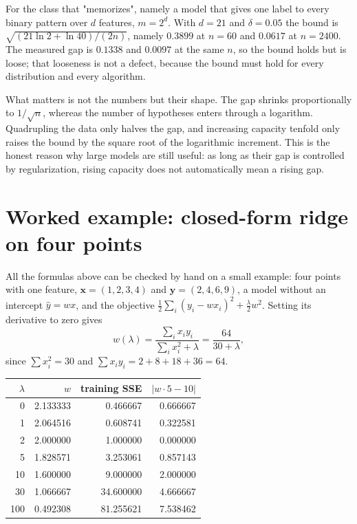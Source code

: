 For the class that "memorizes", namely a model that gives one label to every binary
pattern over $d$ features, $m=2^d$. With $d=21$ and $\delta=0.05$ the bound is
$\sqrt{(21\ln2+\ln40)/(2n)}$, namely $0.3899$ at $n=60$ and $0.0617$ at
$n=2400$. The measured gap is $0.1338$ and $0.0097$ at the same $n$, so the bound
holds but is loose; that looseness is not a defect, because the bound must hold for
every distribution and every algorithm.

What matters is not the numbers but their shape. The gap shrinks proportionally to
$1/\sqrt n$, whereas the number of hypotheses enters through a logarithm. Quadrupling
the data only halves the gap, and increasing capacity tenfold only raises the bound by
the square root of the logarithmic increment. This is the honest reason why large
models are still useful: as long as their gap is controlled by regularization, rising
capacity does not automatically mean a rising gap.
\section{Worked example: closed-form ridge on four points}

All the formulas above can be checked by hand on a small example: four points with
one feature, $\mathbf{x}=(1,2,3,4)$ and $\mathbf{y}=(2,4,6,9)$, a model without an
intercept $\hat y=wx$, and the objective $\frac12\sum_i(y_i-wx_i)^2+\frac{\lambda}{2}w^2$.
Setting its derivative to zero gives
\[
w(\lambda)=\frac{\sum_ix_iy_i}{\sum_ix_i^2+\lambda}=\frac{64}{30+\lambda},
\]
since $\sum x_i^2=30$ and $\sum x_iy_i=2+8+18+36=64$.

\begin{center}
\small
\begin{tabular}{rrrr}
\hline
$\lambda$ & $w$ & training SSE & $|w\cdot5-10|$ \\
\hline
0   & 2.133333 & 0.466667 & 0.666667 \\
1   & 2.064516 & 0.608741 & 0.322581 \\
2   & 2.000000 & 1.000000 & 0.000000 \\
5   & 1.828571 & 3.253061 & 0.857143 \\
10  & 1.600000 & 9.000000 & 2.000000 \\
30  & 1.066667 & 34.600000 & 4.666667 \\
100 & 0.492308 & 81.255621 & 7.538462 \\
\hline
\end{tabular}
\end{center}

